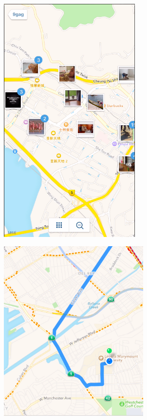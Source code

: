 \documentclass[11pt]{article}
\begin{document}
\begin{figure}[ht]
\centering
\includegraphics[height=5in]{images/maps_with_pictures.png}
\label{google_tracking}
\end{figure}

\begin{figure}[ht]
\centering
\includegraphics[width=3in]{images/gps.png}
\label{google_tracking}
\end{figure}
\end{document}
